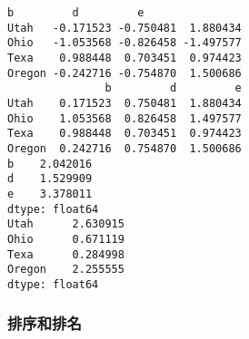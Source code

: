 \documentclass[11pt]{article}
\begin{document}
    \begin{Verbatim}[commandchars=\\\{\}]
               b         d         e
Utah   -0.171523 -0.750481  1.880434
Ohio   -1.053568 -0.826458 -1.497577
Texa    0.988448  0.703451  0.974423
Oregon -0.242716 -0.754870  1.500686
               b         d         e
Utah    0.171523  0.750481  1.880434
Ohio    1.053568  0.826458  1.497577
Texa    0.988448  0.703451  0.974423
Oregon  0.242716  0.754870  1.500686
b    2.042016
d    1.529909
e    3.378011
dtype: float64
Utah      2.630915
Ohio      0.671119
Texa      0.284998
Oregon    2.255555
dtype: float64
    \end{Verbatim}

    \hypertarget{ux6392ux5e8fux548cux6392ux540d}{%
\subsubsection{排序和排名}\label{ux6392ux5e8fux548cux6392ux540d}}
\end{document}
